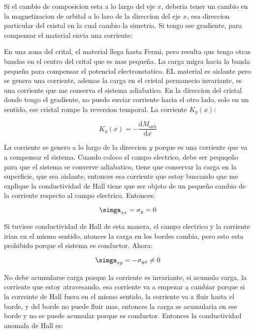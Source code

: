 \documentclass[11pt,fleqn]{book}
\begin{document}
Si el cambio de composicion esta a lo largo del eje $x$, deberia tener un cambio en la magnetizacion de orbital a lo laro de la direccion del eje $x$, esa direccion particular del cristal en la cual cambio  la simetria. Si tengo ese gradiente, para compensar el material envia una corriente:


En una zona del crital, el material llega hasta Fermi, pero resulta que tengo otras bandas en el centro del crital que es mas pequeña. La carga migra hacia la banda pequeña para compensar el potencial electronstatico. EL material es aislante pero se genera una corriente, ademas la carga en el cristal permanecio invariante, es una corriente que me conserva el sistema adiabatico. En la direccion del cristal donde tengo el gradiente, no puedo enviar corriente hacia el otro lado, solo en un sentido, ese cristal rompe la reversion temporal. La corriente $K_{y}(x)$:

\begin{equation}
    K_{y}(x)=-\frac{\mathrm{d}M_{\text{orb}}}{\mathrm{d}x}
\end{equation}

La corriente se genero a lo largo de la direccion $y$ porque es una corriente que va a compensar el sistema. Cuando coloco el campo electrico, debe ser pequqeño para que el sistema se converve adiabatico, tiene que conservar la carga en la superficie, que sea aislante, entonces esa corriente que estoy buscando que me explique la conductividad de Hall tiene que ser objeto de un pequeño cambio de la corriente respecto al campo electrico. Entonces:

\begin{equation}
    \simga_{xx}=\sigma_{y}=0
\end{equation}

Si tuviese conductividad de Hall de esta manera, el campo electrico y la corriente irian en el mismo sentido, ntonces la carga en los bordes cambia, pero esto esta prohibido porque el sistema es conductor. Ahora:

\begin{equation}
       \simga_{xy}=-\sigma_{yx}\neq0
\end{equation}

No debe acumularse carga porque la corriente es invariante, si acumulo carga, la corriente que estoy atravesando, esa corriente va a empezar a cambiar porque si la correinte de Hall fuera en el mismo sentido, la corriente va a fluir hasta el borde, y del borde no puede fluir mas, entonces la carga se acumularia en ese borde y no se puede acumular porque es conductor. Entonces la conductividad anomala de Hall es:
\end{document}
